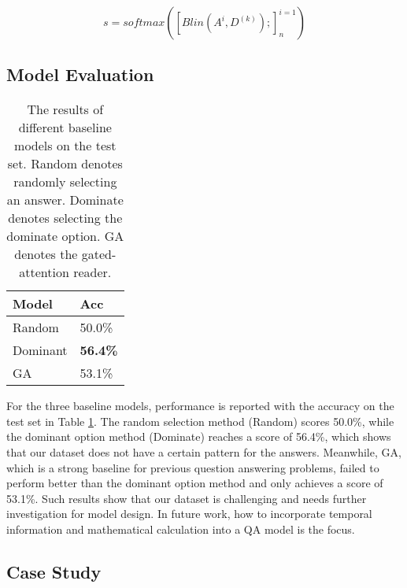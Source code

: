 \begin{equation}
    s = softmax([Blin(A^i,D^{(k)});]^{i=1}_{n})
\end{equation}

\subsection{Model Evaluation}

\begin{table}[h]
\begin{center}
\begin{tabular}{ll}
\hline
\bf Model                              & \bf Acc        \\
\hline
Random                          & 50.0\% \\
Dominant & \textbf{56.4\%}\\
GA & 53.1\%\\

\hline
\end{tabular}
\end{center}
\caption{\label{rel} The results of different baseline models on the test set. Random denotes randomly selecting an answer. Dominate denotes selecting the dominate option. GA denotes the gated-attention reader.}
\end{table}

For the three baseline models, performance is reported with the accuracy on the test set in Table \ref{rel}. The random selection method (Random) scores 50.0\%, while the dominant option method (Dominate) reaches a score of 56.4\%, which shows that our dataset does not have a certain pattern for the answers. Meanwhile, GA, which is a strong baseline for previous question answering problems, failed to perform better than the dominant option method and only achieves a score of 53.1\%. Such results show that our dataset is challenging and needs further investigation for model design. In future work, how to incorporate temporal information and mathematical calculation into a QA model is the focus.

\subsection{Case Study}

